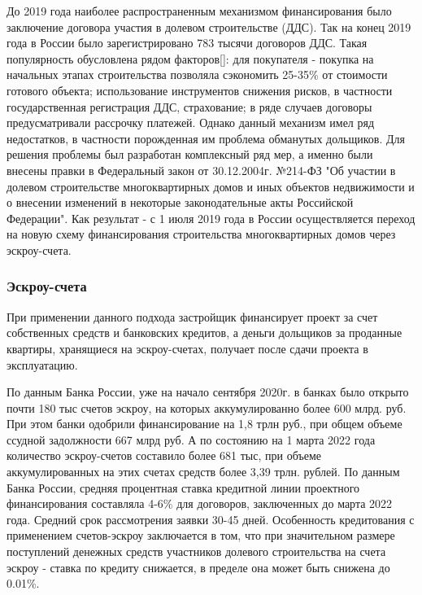 \documentclass[12pt,a4paper]{article} %
\begin{document}
До 2019 года наиболее распространенным механизмом финансирования было заключение договора участия в долевом строительстве (ДДС). Так на конец 2019 года в России было зарегистрировано 783 тысячи договоров ДДС. Такая популярность обусловлена рядом факторов[]: для покупателя - покупка на начальных этапах строительства позволяла сэкономить 25-35\% от стоимости готового объекта; использование инструментов снижения рисков, в частности государственная регистрация ДДС, страхование; в ряде случаев договоры предусматривали рассрочку платежей. Однако данный механизм имел ряд недостатков, в частности порожденная им проблема обманутых дольщиков. 
Для решения проблемы был разработан комплексный ряд мер, а именно были внесены правки в Федеральный закон от 30.12.2004г. №214-ФЗ "Об участии в долевом строительстве многоквартирных домов и иных объектов недвижимости и о
внесении изменений в некоторые законодательные акты Российской
Федерации". Как результат - с 1 июля 2019 года в России осуществляется переход на новую схему финансирования строительства многоквартирных домов через эскроу-счета.

\subsubsection{Эскроу-счета}

При применении данного подхода застройщик финансирует проект за счет собственных средств и банковских кредитов, а деньги дольщиков за проданные квартиры, хранящиеся на эскроу-счетах,  получает после сдачи проекта в эксплуатацию. 

По данным Банка России, уже на начало сентября 2020г. в банках было открыто почти 180 тыс счетов эскроу, на которых аккумулированно более 600 млрд. руб. При этом банки одобрили финансирование на 1,8 трлн руб., при общем объеме ссудной задолжности 667 млрд руб. А по состоянию на 1 марта 2022 года количество эскроу-счетов составило более 681 тыс, при объеме аккумулированных на этих счетах средств более 3,39 трлн. рублей. 
По данным Банка России, средняя процентная ставка кредитной линии проектного финансирования составляла 4-6\% для договоров, заключенных до марта 2022 года. Средний срок рассмотрения заявки 30-45 дней. Особенность кредитования с применением счетов-эскроу заключается в том, что при значительном размере поступлений денежных средств участников долевого строительства на счета эскроу - ставка по кредиту снижается, в пределе она может быть снижена до 0.01\%.
\end{document}
